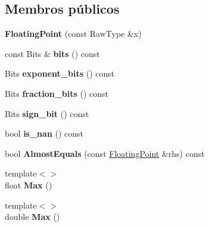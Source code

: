 \subsection*{Membros públicos}
\begin{DoxyCompactItemize}
\item 
\hypertarget{classtesting_1_1internal_1_1FloatingPoint_a0dabf840863e0df84046f171c891fe71}{{\bfseries Floating\-Point} (const Raw\-Type \&x)}\label{classtesting_1_1internal_1_1FloatingPoint_a0dabf840863e0df84046f171c891fe71}

\item 
\hypertarget{classtesting_1_1internal_1_1FloatingPoint_abead51f16ec6ea84360a976da1cd1387}{const Bits \& {\bfseries bits} () const }\label{classtesting_1_1internal_1_1FloatingPoint_abead51f16ec6ea84360a976da1cd1387}

\item 
\hypertarget{classtesting_1_1internal_1_1FloatingPoint_af53c50b85408c582540d6244c026ce2b}{Bits {\bfseries exponent\-\_\-bits} () const }\label{classtesting_1_1internal_1_1FloatingPoint_af53c50b85408c582540d6244c026ce2b}

\item 
\hypertarget{classtesting_1_1internal_1_1FloatingPoint_aa0167b7b10a934b743ba3c1f47421e63}{Bits {\bfseries fraction\-\_\-bits} () const }\label{classtesting_1_1internal_1_1FloatingPoint_aa0167b7b10a934b743ba3c1f47421e63}

\item 
\hypertarget{classtesting_1_1internal_1_1FloatingPoint_a6176cc4d443724477f2799bcbd9f020a}{Bits {\bfseries sign\-\_\-bit} () const }\label{classtesting_1_1internal_1_1FloatingPoint_a6176cc4d443724477f2799bcbd9f020a}

\item 
\hypertarget{classtesting_1_1internal_1_1FloatingPoint_aaef2fd2cd8cdf791206a5e9fed8ef90d}{bool {\bfseries is\-\_\-nan} () const }\label{classtesting_1_1internal_1_1FloatingPoint_aaef2fd2cd8cdf791206a5e9fed8ef90d}

\item 
\hypertarget{classtesting_1_1internal_1_1FloatingPoint_adb0fe9ab1d9e5288f8e5550234211166}{bool {\bfseries Almost\-Equals} (const \hyperlink{classtesting_1_1internal_1_1FloatingPoint}{Floating\-Point} \&rhs) const }\label{classtesting_1_1internal_1_1FloatingPoint_adb0fe9ab1d9e5288f8e5550234211166}

\item 
\hypertarget{classtesting_1_1internal_1_1FloatingPoint_af2eda9331e679229a1baa3404b57b51d}{{\footnotesize template$<$$>$ }\\float {\bfseries Max} ()}\label{classtesting_1_1internal_1_1FloatingPoint_af2eda9331e679229a1baa3404b57b51d}

\item 
\hypertarget{classtesting_1_1internal_1_1FloatingPoint_afc2e85c0e886cb13b2300e961c9a9648}{{\footnotesize template$<$$>$ }\\double {\bfseries Max} ()}\label{classtesting_1_1internal_1_1FloatingPoint_afc2e85c0e886cb13b2300e961c9a9648}

\end{DoxyCompactItemize}
